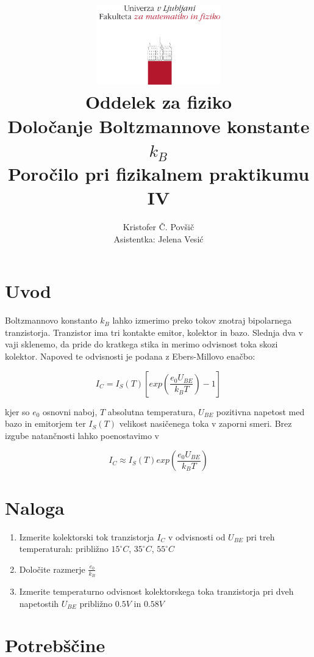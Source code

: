 \documentclass[12pt]{report}
\title{
  \includegraphics[width=0.4\textwidth]{fmf_logo}\\
  {\small Oddelek za fiziko} \\
  {Določanje Boltzmannove konstante $k_B$}\\
  {\small Poročilo pri fizikalnem praktikumu IV}\\

}
\date{}
\author{ Kristofer Č. Povšič \\[5 cm]
 \small  Asistentka: Jelena Vesić
}
\begin{document}
\setcounter{page}{2}

\maketitle

\chapter*{Uvod}

Boltzmannovo konstanto $k_B$ lahko izmerimo preko tokov znotraj bipolarnega tranzistorja. Tranzistor ima tri kontakte emitor, kolektor in bazo. Slednja dva v vaji sklenemo, da pride do kratkega stika in merimo odvisnost toka skozi kolektor. Napoved te odvisnosti je podana z Ebers-Millovo enačbo:

\begin{equation}
  I_C = I_S(T)\left[exp\left(\frac{e_0 U_{BE}}{k_B T}\right) - 1 \right]
\end{equation}

kjer so $e_0$ osnovni naboj, $T$ absolutna temperatura, $U_{BE}$ pozitivna napetost med bazo in emitorjem ter $I_S (T)$ velikost nasičenega toka v zaporni smeri. Brez izgube natančnosti lahko poenostavimo v 

\begin{equation}
  I_C \approx I_S(T) exp\left(\frac{e_0 U_{BE}}{k_B T}\right)
\end{equation}


\chapter*{Naloga}

\begin{enumerate}
  \item Izmerite kolektorski tok tranzistorja $I_C$ v odvisnosti od $U_{BE}$ pri treh temperaturah: približno $15 ^\circ C$, $35 ^\circ C$, $55 ^\circ C$
  \item Določite razmerje $\frac{e_0}{k_B}$
  \item Izmerite temperaturno odvisnost kolektorskega toka tranzistorja pri dveh napetostih $U_{BE}$ približno $0.5V$ in $0.58V$
\end{enumerate}


\begingroup
\let\clearpage\relax

\chapter*{Potrebščine}
\end{document}
